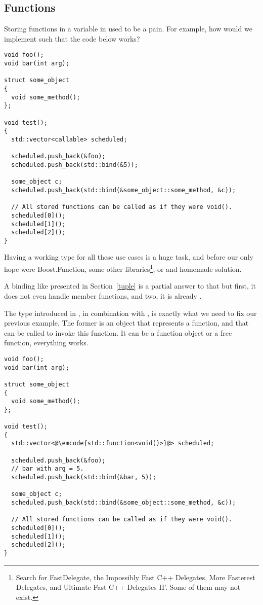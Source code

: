 \subsection{Functions}

Storing functions in a variable in \cpp{} used to be a pain. For
example, how would we implement  such that the code
below works?

\begin{lstlisting}
void foo();
void bar(int arg);

struct some_object
{
  void some_method();
};

void test();
{
  std::vector<callable> scheduled;

  scheduled.push_back(&foo);
  scheduled.push_back(std::bind(&5));

  some_object c;
  scheduled.push_back(std::bind(&some_object::some_method, &c));

  // All stored functions can be called as if they were void().
  scheduled[0]();
  scheduled[1]();
  scheduled[2]();
}
\end{lstlisting}

Having a working type for all these use cases is a huge task, and
before  our only hope were Boost.Function, some other
libraries\footnote{Search for FastDelegate, the Impossibly Fast C++
  Delegates, More Fasterest Delegates, and Ultimate Fast C++ Delegates
  II'. Some of them may not exist.}, or and homemade solution.

A binding like presented in Section~\ref{tuple} is a partial answer to
that but first, it does not even handle member functions, and two, it
is already .

\bigskip

The  type introduced in , in combination
with  , is exactly what we
need to fix our previous example. The former is an object that represents a
function, and that can be called to invoke this function. It can be a
function object or a free function, everything works.

\begin{lstlisting}
void foo();
void bar(int arg);

struct some_object
{
  void some_method();
};

void test();
{
  std::vector<@\emcode{std::function<void()>}@> scheduled;

  scheduled.push_back(&foo);
  // bar with arg = 5.
  scheduled.push_back(std::bind(&bar, 5));

  some_object c;
  scheduled.push_back(std::bind(&some_object::some_method, &c));

  // All stored functions can be called as if they were void().
  scheduled[0]();
  scheduled[1]();
  scheduled[2]();
}
\end{lstlisting}

